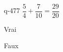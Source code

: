 \begin{truefalse}{q-477}
$\dfrac{5}{4} + \dfrac{7}{10}  = \dfrac{29}{20}$
\item Vrai
\item* Faux
\end{truefalse}

